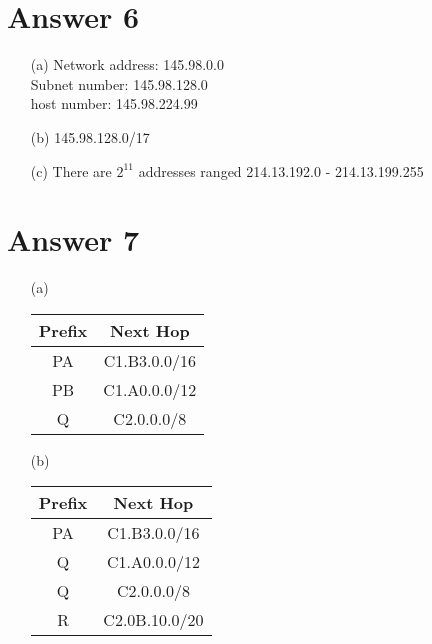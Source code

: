 \documentclass[11pt]{article}
\theoremstyle{definition}
\begin{document}
\section*{Answer 6}
\begin{enumerate}
	\item[(a)]
	Network address: 145.98.0.0\\
	Subnet number: 145.98.128.0\\
	host number: 145.98.224.99\\

	\item[(b)] 145.98.128.0/17

	\item[(c)] There are $2^{11}$ addresses ranged 214.13.192.0 - 214.13.199.255

\end{enumerate}

\section*{Answer 7}
\begin{enumerate}
	\item[(a)] 
	\begin{tabular}{|c|c|}
	\hline
	Prefix & Next Hop\\
	\hline
	PA & C1.B3.0.0/16\\
	PB & C1.A0.0.0/12\\
	Q & C2.0.0.0/8\\
	\end{tabular}

	\item[(b)]
	\begin{tabular}{|c|c|}
	\hline
	Prefix & Next Hop\\
	\hline
	PA & C1.B3.0.0/16\\
	Q & C1.A0.0.0/12\\
	Q & C2.0.0.0/8\\
	R & C2.0B.10.0/20\\
	\end{tabular}
\end{enumerate}
\end{document}
